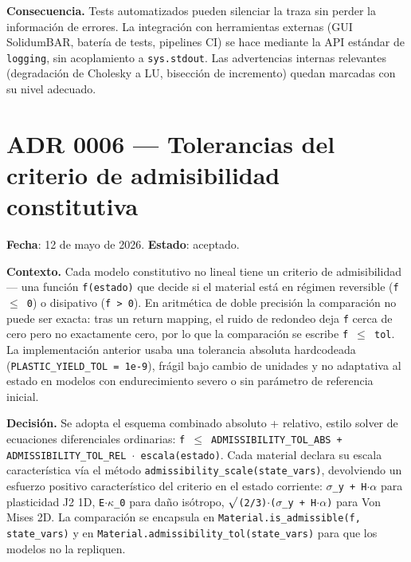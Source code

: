 \documentclass[11pt,oneside]{report}
\begin{document}
\textbf{Consecuencia.} Tests automatizados pueden silenciar la traza sin perder la información de errores. La integración con herramientas externas (GUI SolidumBAR, batería de tests, pipelines CI) se hace mediante la API estándar de \texttt{logging}, sin acoplamiento a \texttt{sys.stdout}. Las advertencias internas relevantes (degradación de Cholesky a LU, bisección de incremento) quedan marcadas con su nivel adecuado.

\section{ADR 0006 --- Tolerancias del criterio de admisibilidad constitutiva}
\label{adr:0006}

\textbf{Fecha}: 12 de mayo de 2026. \textbf{Estado}: aceptado.

\textbf{Contexto.} Cada modelo constitutivo no lineal tiene un criterio de admisibilidad --- una función \texttt{f(estado)} que decide si el material está en régimen reversible (\texttt{f \ensuremath{\le} 0}) o disipativo (\texttt{f \textgreater{} 0}). En aritmética de doble precisión la comparación no puede ser exacta: tras un return mapping, el ruido de redondeo deja \texttt{f} cerca de cero pero no exactamente cero, por lo que la comparación se escribe \texttt{f \ensuremath{\le} tol}. La implementación anterior usaba una tolerancia absoluta hardcodeada (\texttt{PLASTIC\_\allowbreak{}YIELD\_\allowbreak{}TOL = 1e-9}), frágil bajo cambio de unidades y no adaptativa al estado en modelos con endurecimiento severo o sin parámetro de referencia inicial.

\textbf{Decisión.} Se adopta el esquema combinado absoluto + relativo, estilo solver de ecuaciones diferenciales ordinarias: \texttt{f \ensuremath{\le} ADMISSIBILITY\_\allowbreak{}TOL\_\allowbreak{}ABS + ADMISSIBILITY\_\allowbreak{}TOL\_\allowbreak{}REL \ensuremath{\cdot} escala(estado)}. Cada material declara su escala característica vía el método \texttt{admissibility\_\allowbreak{}scale(state\_\allowbreak{}vars)}, devolviendo un esfuerzo positivo característico del criterio en el estado corriente: \texttt{\ensuremath{\sigma}\_y + H\ensuremath{\cdot}\ensuremath{\alpha}} para plasticidad J2 1D, \texttt{E\ensuremath{\cdot}\ensuremath{\kappa}\_0} para daño isótropo, \texttt{\ensuremath{\surd}(2/\allowbreak{}3)\ensuremath{\cdot}(\ensuremath{\sigma}\_\allowbreak{}y + H\ensuremath{\cdot}\ensuremath{\alpha})} para Von Mises 2D. La comparación se encapsula en \texttt{Material.\allowbreak{}is\_\allowbreak{}admissible(f, state\_\allowbreak{}vars)} y en \texttt{Material.\allowbreak{}admissibility\_\allowbreak{}tol(state\_\allowbreak{}vars)} para que los modelos no la repliquen.
\end{document}
